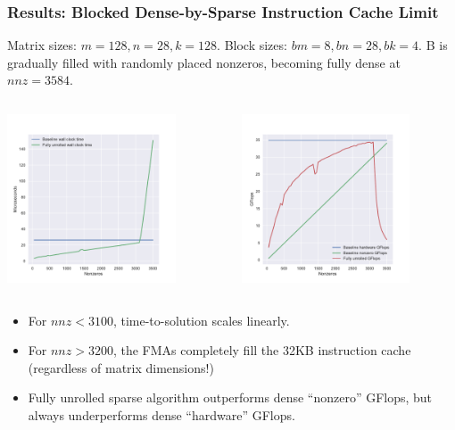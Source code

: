 \documentclass[9pt]{beamer}
\begin{document}
\begin{frame}[fragile]
  \frametitle{Results: Blocked Dense-by-Sparse Instruction Cache Limit}
  Matrix sizes: $m=128, n=28, k=128$. Block sizes: $bm=8, bn=28, bk=4$.
  B is gradually filled with randomly placed nonzeros, becoming fully dense at $nnz=3584$.

  \begin{columns}[t]
    \begin{column}{0.45\textwidth}
      \centering
      \includegraphics[height=5cm]{images/unrolled_scaling_time.pdf}
    \end{column}
    \begin{column}{0.45\textwidth}
      \centering
      \includegraphics[height=5cm]{images/unrolled_scaling_flops.pdf}
    \end{column}
  \end{columns}

  \begin{itemize}
    \item For $nnz < 3100$, time-to-solution scales linearly.
    \item For $nnz > 3200$, the FMAs completely fill the 32KB instruction cache (regardless of matrix dimensions!)
    \item Fully unrolled sparse algorithm outperforms dense ``nonzero'' GFlops, but always underperforms dense ``hardware'' GFlops.
    
  \end{itemize}
\end{frame}
\end{document}
